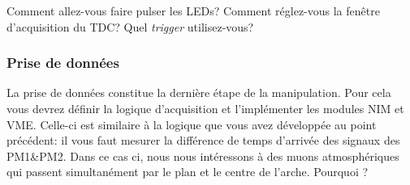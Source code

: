 Comment allez-vous faire pulser les LEDs?
Comment réglez-vous la fenêtre d'acquisition du TDC?
Quel \textit{trigger} utilisez-vous?


\subsubsection{Prise de données}

La prise de données constitue la dernière étape de la manipulation.
Pour cela vous devrez définir la logique d'acquisition et l'implémenter les modules NIM et VME.
Celle-ci est similaire à la logique que vous avez développée au point précédent: il vous faut mesurer la différence de temps d'arrivée des signaux des PM1\&PM2.
Dans ce cas ci, nous nous intéressons à des muons atmosphériques qui passent simultanément par le plan et le centre de l'arche. Pourquoi ?

